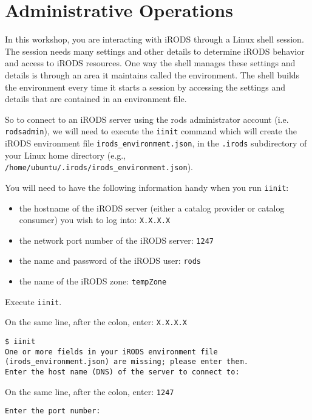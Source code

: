 \documentclass[10pt,oneside]{memoir}
\begin{document}
\section{Administrative Operations}
In this workshop, you are interacting with iRODS through a Linux shell session. The session needs many settings and other details to determine iRODS behavior and access to iRODS resources. One way the shell manages these settings and details is through an area it maintains called the environment. The shell builds the environment every time it starts a session by accessing the settings and details that are contained in an environment file.

So to connect to an iRODS server using the rods administrator account (i.e. \texttt{rodsadmin}), we will need to execute the \texttt{iinit} command which will create the iRODS environment file \texttt{irods\_environment.json}, in the \texttt{.irods} subdirectory of your Linux home directory (e.g., \texttt{/home/ubuntu/.irods/irods\_environment.json}).

\newpage

You will need to have the following information handy when you run \texttt{iinit}:
\begin{itemize}
 \item the hostname of the iRODS server (either a catalog provider or catalog consumer) you wish to log into: \texttt{X.X.X.X}
 \item the network port number of the iRODS server: \texttt{1247}
 \item the name and password of the iRODS user: \texttt{rods}
 \item the name of the iRODS zone: \texttt{tempZone}
\end{itemize}

Execute \texttt{iinit}.

On the same line, after the colon, enter: \texttt{X.X.X.X}

\begin{lstlisting}[basicstyle=\scriptsize\ttfamily]
$ iinit
One or more fields in your iRODS environment file (irods_environment.json) are missing; please enter them.
Enter the host name (DNS) of the server to connect to:
\end{lstlisting}

On the same line, after the colon, enter: \texttt{1247}

\begin{lstlisting}[basicstyle=\scriptsize\ttfamily]
Enter the port number:
\end{lstlisting}
\end{document}
